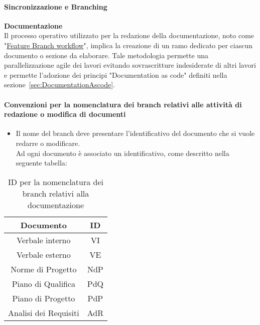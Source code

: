 \hypertarget{par:sincronizzazione&branching}{\paragraph{Sincronizzazione e Branching}}
\textbf{Documentazione} \\
Il processo operativo utilizzato per la redazione della documentazione, noto come "\href{https://www.atlassian.com/git/tutorials/comparing-workflows/feature-branch-workflow}{Feature Branch workflow}", implica la creazione di un ramo dedicato per ciascun documento o sezione da elaborare.
Tale metodologia permette una parallelizzazione agile dei lavori evitando sovrascritture indesiderate di altri lavori e permette l'adozione dei principi "Documentation as code" definiti nella sezione~\ref{sec:DocumentationAscode}. \\ 

\paragraph*{\hypertarget{par:convezioninomenclaturabranchdocumenti}{\textbf{Convenzioni per la nomenclatura dei branch relativi alle attività di redazione o modifica di documenti}}}

\begin{itemize}
    \item Il nome del branch deve presentare l'identificativo del documento che si vuole redarre o modificare. \\
    Ad ogni documento è associato un identificativo, come descritto nella seguente tabella:
\end{itemize}

\begin{table}[H]
    \centering
    \begin{tabular}{|c|c|}
        \hline
        Documento & ID \\
        \hline
        Verbale interno & VI \\
        Verbale esterno & VE \\
        Norme di Progetto & NdP \\
        Piano di Qualifica & PdQ \\
        Piano di Progetto & PdP \\ 
        Analisi dei Requisiti & AdR \\
        \hline
    \end{tabular}
    \caption{ID per la nomenclatura dei branch relativi alla documentazione}
\end{table}

